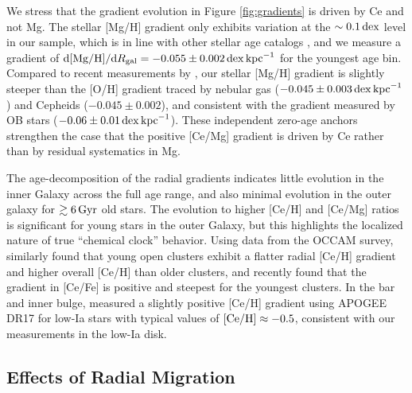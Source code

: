 \documentclass[twocolumn,twocolappendix]{aastex701}
\newcommand{\bracket}[2][H]{{\rm [#2/#1]}}
\newcommand{\kpc}{\,{\rm kpc}}
\newcommand{\Gyr}{\,{\rm Gyr}}
\newcommand{\dex}{\,{\rm dex}}
\begin{document}
We stress that the gradient evolution in Figure \ref{fig:gradients} is driven by Ce and not Mg. The stellar [Mg/H] gradient only exhibits variation at the $\sim0.1\dex$ level in our sample, which is in line with other stellar age catalogs \citep[e.g.,][]{roberts_cn_2026}, and we measure a gradient of ${\rm d}\bracket{Mg}/{\rm d}R_{\rm gal}=-0.055\pm0.002\dex\kpc^{-1}$ for the youngest age bin. Compared to recent measurements by \citet{martinez-hernandez_desired_2026}, our stellar [Mg/H] gradient is slightly steeper than the [O/H] gradient traced by nebular gas ($-0.045\pm0.003\dex\kpc^{-1}$) and Cepheids ($-0.045\pm0.002$), and consistent with the gradient measured by OB stars ($-0.06\pm0.01\dex\kpc^{-1}$). These independent zero-age anchors strengthen the case that the positive [Ce/Mg] gradient is driven by Ce rather than by residual systematics in Mg.

The age-decomposition of the radial gradients indicates little evolution in the inner Galaxy across the full age range, and also minimal evolution in the outer galaxy for $\gtrsim6\Gyr$ old stars. The evolution to higher [Ce/H] and [Ce/Mg] ratios is significant for young stars in the outer Galaxy, but this highlights the localized nature of true ``chemical clock'' behavior. Using data from the OCCAM survey, \citet{sales-silva_exploring_2022} similarly found that young open clusters exhibit a flatter radial [Ce/H] gradient and higher overall [Ce/H] than older clusters, and recently \citet{otto_open_2026} found that the gradient in [Ce/Fe] is positive and steepest for the youngest clusters. In the bar and inner bulge, \citet{sales-silva_chemical_2026} measured a slightly positive [Ce/H] gradient using APOGEE DR17 for low-Ia stars with typical values of $\bracket{Ce}\approx-0.5$, consistent with our measurements in the low-Ia disk.

\subsection{Effects of Radial Migration}
\end{document}
